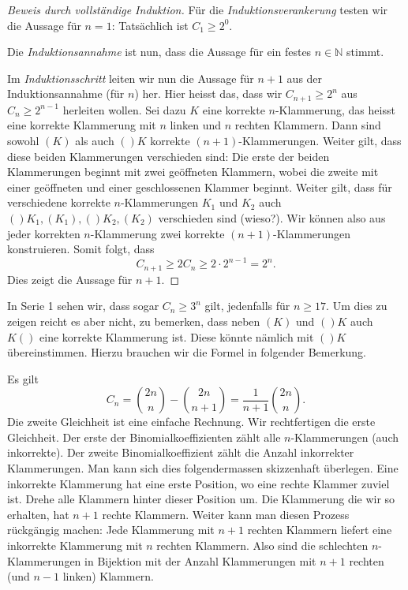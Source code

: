 \documentclass[../main.tex]{subfiles}
\begin{document}
\begin{proof}[Beweis durch vollständige Induktion]
  Für die \emph{Induktionsverankerung} testen wir die Aussage für $n = 1$:
  Tatsächlich
  ist $C_{1} \geq 2^{0}$.

  Die \emph{Induktionsannahme} ist nun,
  dass die Aussage für ein festes $n \in \mathbb N$ stimmt.

  Im \emph{Induktionsschritt} leiten wir nun die Aussage für $n + 1$
  aus der Induktionsannahme (für $n$) her.
  Hier heisst das, dass wir $C_{n+1} \geq 2^{n}$ aus $C_{n} \geq 2^{n-1}$
  herleiten wollen. Sei dazu $K$ eine korrekte $n$-Klammerung,
  das heisst eine korrekte
  Klammerung mit $n$ linken und $n$ rechten Klammern.
  Dann sind sowohl $(K)$ als auch $()K$ korrekte $(n+1)$-Klammerungen.
  Weiter gilt, dass diese beiden Klammerungen verschieden sind:
  Die erste der beiden Klammerungen beginnt mit zwei geöffneten Klammern,
  wobei die zweite mit einer geöffneten und einer geschlossenen
  Klammer beginnt.
  Weiter gilt, dass für verschiedene
  korrekte $n$-Klammerungen $K_{1}$ und $K_{2}$
  auch $()K_{1}, (K_{1}), ()K_{2}, (K_{2})$ verschieden sind (wieso?).
  Wir können also aus jeder korrekten $n$-Klammerung zwei korrekte
  $(n+1)$-Klammerungen konstruieren. Somit folgt, dass
  \[C_{n+1} \geq 2 C_{n} \geq 2 \cdot 2^{n-1} = 2^{n}.\]
  Dies zeigt die Aussage für $n+ 1$.
\end{proof}

In Serie 1 sehen wir, dass sogar $C_{n} \geq 3^{n}$ gilt,
jedenfalls für $n \geq 17$.
Um dies zu zeigen reicht es aber nicht, zu bemerken,
dass neben $(K)$ und $()K$ auch $K()$ eine korrekte
Klammerung ist. Diese könnte nämlich mit $()K$
übereinstimmen.
Hierzu brauchen wir die Formel in folgender Bemerkung.

\begin{remark}
  Es gilt
  \[
    C_{n} = \binom{2n}{n} - \binom{2n}{n+1} = \frac{1}{n+1}\binom{2n}{n}.
  \]
  Die zweite Gleichheit ist eine einfache Rechnung.
  Wir rechtfertigen die erste Gleichheit.
  Der erste der Binomialkoeffizienten zählt alle $n$-Klammerungen (auch inkorrekte).
  Der zweite Binomialkoeffizient zählt die Anzahl inkorrekter Klammerungen.
  Man kann sich dies folgendermassen skizzenhaft überlegen.
  Eine inkorrekte Klammerung hat eine erste Position,
  wo eine rechte Klammer zuviel ist.
  Drehe alle Klammern hinter dieser Position um.
  Die Klammerung die wir so erhalten, hat $n+1$ rechte Klammern.
  Weiter kann man diesen Prozess rückgängig machen:
  Jede Klammerung mit $n+1$ rechten Klammern
  liefert eine inkorrekte Klammerung mit $n$ rechten Klammern.
  Also sind die schlechten $n$-Klammerungen in Bijektion
  mit der Anzahl Klammerungen mit $n+1$ rechten
  (und $n-1$ linken) Klammern.
\end{remark}
\end{document}
